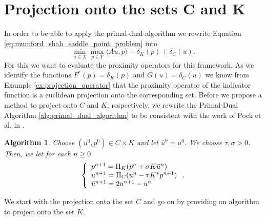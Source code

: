 \documentclass[abstracton]{scrreprt}
\newtheorem{algorithm}[theorem]{Algorithm}
\begin{document}

    \section{Projection onto the sets $\boldsymbol{C}$ and $\boldsymbol{K}$} %
    \label{sec:projection_onto_the_sets_C_and_K}

        In order to be able to apply the primal-dual algorithm we rewrite Equation \ref{eq:mumford_shah_saddle_point_problem} into
            $$
                \min_{u \in X} \max_{p \in Y} \langle Au, p \rangle - \delta_{K}(p) + \delta_{C}(u).
            $$
        For this we want to evaluate the proximity operators for this framework. As we identify the functions $F^{\ast}(p) = \delta_{K}(p)$ and $G(u) = \delta_{C}(u)$ we know from Example \ref{ex:projection_operator} that the proximity operator of the indicator function is a euclidean projection onto the corresponding set. Before we propose a method to project onto $C$ and $K$, respectively, we rewrite the Primal-Dual Algorithm \ref{alg:primal_dual_algorithm} to be consistent with the work of Pock et al. in \cite{Pock-et-al-iccv09}.
          \begin{algorithm}\label{alg:primal_dual_cremers}
                Choose $(u^{0}, p^{0}) \in C \times K$ and let $\bar{u}^{0} = u^{0}$. We choose $\tau, \sigma > 0$. Then, we let for each $n \ge 0$
                    \begin{equation}
                        \left\{ 
                            \begin{array}{l l}
                              p^{n+1} = \Pi_{K} (p^{n} + \sigma K \bar{u}^{n}) \\
                              u^{n+1} = \Pi_{C} (u^{n} - \tau K^{*} p^{n+1}) \\
                              \bar{u}^{n+1} = 2u^{n+1} - u^{n}
                            \end{array}
                        \right. .
                    \end{equation}
            \end{algorithm}
        We start with the projection onto the set $C$ and go on by providing an algorithm to project onto the set $K$.
\end{document}
